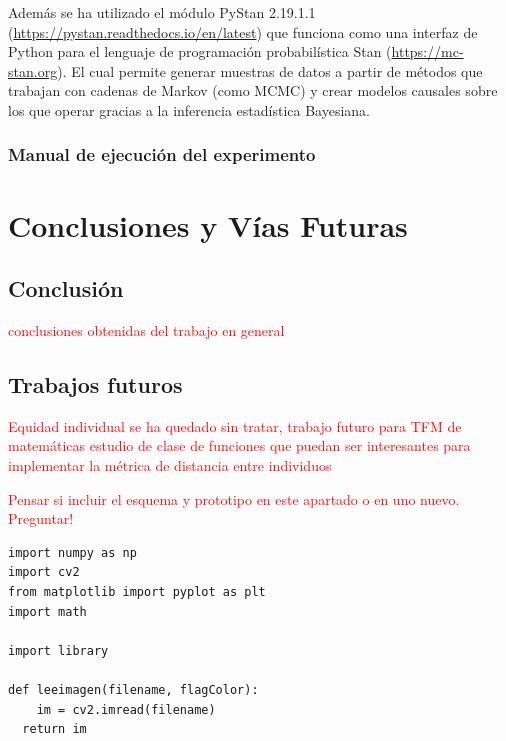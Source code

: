\documentclass[oneside,openright,titlepage,numbers=noenddot,openany,headinclude,footinclude=true,
cleardoublepage=empty,abstractoff,BCOR=5mm,paper=a4,fontsize=12pt,main=spanish]{scrreprt}
\begin{document}
Además se ha utilizado el módulo PyStan 2.19.1.1 (\url{https://pystan.readthedocs.io/en/latest}) que funciona como una interfaz de Python para el lenguaje de programación probabilística Stan (\url{https://mc-stan.org}). El cual permite generar muestras de datos a partir de métodos que trabajan con cadenas de Markov (como MCMC) y crear modelos causales sobre los que operar gracias a la inferencia estadística Bayesiana.

\section{Manual de ejecución del experimento}


\part{Conclusiones y Vías Futuras} \label{part:debate_fut}

\chapter{Conclusión} \label{ch:conclusion}

\textcolor{red}{conclusiones obtenidas del trabajo en general}

\chapter{Trabajos futuros} \label{ch:trabajos_fut}

\textcolor{red}{Equidad individual se ha quedado sin tratar, trabajo futuro para TFM de matemáticas estudio de clase de funciones que puedan ser interesantes para implementar la métrica de distancia entre individuos}

\textcolor{red}{Pensar si incluir el esquema y prototipo en este apartado o en uno nuevo. Preguntar!}

\begin{verbatim}
import numpy as np
import cv2
from matplotlib import pyplot as plt
import math

import library

def leeimagen(filename, flagColor):
    im = cv2.imread(filename)
  return im
\end{verbatim}
\end{document}
